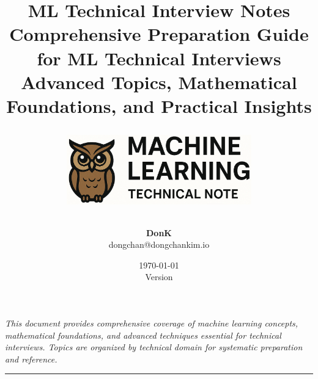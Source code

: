 \documentclass[11pt]{article}
\title{
  \vspace{2cm}
  \Huge\textbf{\textcolor{primaryteal}{ML Technical Interview Notes}} \\
  \vspace{1cm}
  \Large{Comprehensive Preparation Guide for ML Technical Interviews} \\
  \vspace{0.5cm}
  \large{Advanced Topics, Mathematical Foundations, and Practical Insights} \\
  \vspace{2cm}
  \begin{center}
    \includegraphics[width=0.6\textwidth]{images/p_logo.png}
  \end{center}
  \vspace{2cm}
}
\author{
  \Large\textbf{DonK} \\
  \large{dongchan@dongchankim.io} \\
}
\date{
  \large{\today} \\
  \small\textcolor{accentorange}{Version \docversion}
}
\begin{document}
\begin{titlepage}
	\maketitle
	\thispagestyle{empty}
	\vspace*{\fill}
	\begin{center}
		\begin{minipage}{0.8\textwidth}
			\centering
			\small\textit{
				This document provides comprehensive coverage of machine learning concepts,
				mathematical foundations, and advanced techniques essential for technical interviews. Topics are organized by technical domain for systematic
				preparation and reference.
			}
		\end{minipage}
	\end{center}
	\vspace{1cm}
	\begin{center}
		\textcolor{accentorange}{\rule{0.3\textwidth}{1pt}}
	\end{center}
\end{titlepage}

\newpage

\end{document}
